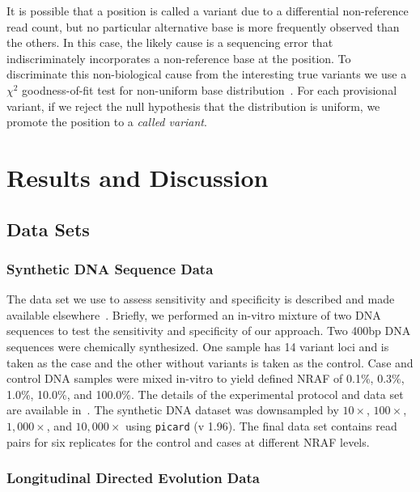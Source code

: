 \documentclass{bmcart}
\begin{document}
It is possible that a position is called a variant due to a differential non-reference read count, but no particular alternative base is more frequently observed than the others.
In this case, the likely cause is a sequencing error that indiscriminately incorporates a non-reference base at the position.
To discriminate this non-biological cause from the interesting true variants we use a $\chi^2$ goodness-of-fit test for non-uniform base distribution~\cite{efron2010large, he2015rvd2}.
For each provisional variant, if we reject the null hypothesis that the distribution is uniform, we promote the position to a \textit{called variant}.


\section{Results and Discussion}

\subsection{Data Sets}

\subsubsection{Synthetic DNA Sequence Data}

The data set we use to assess sensitivity and specificity is described and made available elsewhere~\cite{flaherty2011ultrasensitive}.
Briefly, we performed an in-vitro mixture of two DNA sequences to test the sensitivity and specificity of our approach.
Two 400bp DNA sequences were chemically synthesized. 
One sample has 14 variant loci and is taken as the case and the other without variants is taken as the control.
Case and control DNA samples were mixed in-vitro to yield defined NRAF of 0.1\%, 0.3\%, 1.0\%, 10.0\%, and 100.0\%.
The details of the experimental protocol and data set are available in~\cite{flaherty2011ultrasensitive}.
The synthetic DNA dataset was downsampled by $10\times$, $100\times$, $1,000\times$, and $10,000\times$ using \texttt{picard} (v 1.96).
The final data set contains read pairs for six replicates for the control and cases at different NRAF levels.

\subsubsection{Longitudinal Directed Evolution Data}
\end{document}
